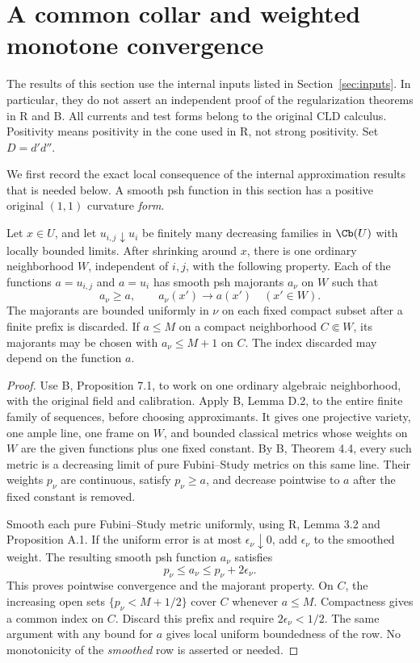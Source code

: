 \section{A common collar and weighted monotone convergence}
\label{sec:monotone}

The results of this section use the internal inputs listed in
Section~\ref{sec:inputs}. In particular, they do not assert an independent
proof of the regularization theorems in \textup{R} and \textup{B}.
All currents and test forms belong to the original CLD calculus.
Positivity means positivity in the cone used in \textup{R}, not strong
positivity. Set $D=d'd''$.

We first record the exact local consequence of the internal approximation
results that is needed below. A smooth psh function in this section has a
positive original $(1,1)$ curvature \emph{form}.

\begin{lemma}
\label{lem:common-majorants}
Let $x\in U$, and let $u_{i,j}\downarrow u_i$ be finitely many decreasing
families in $\Cb(U)$ with locally bounded limits. After shrinking around
$x$, there is one ordinary neighborhood $W$, independent of $i,j$, with
the following property. Each of the functions $a=u_{i,j}$ and $a=u_i$
has smooth psh majorants $a_\nu$ on $W$ such that
\[
 a_\nu\geq a,\qquad a_\nu(x')\longrightarrow a(x')\quad(x'\in W).
\]
The majorants are bounded uniformly in $\nu$ on each fixed compact subset
after a finite prefix is discarded. If $a\leq M$ on a compact neighborhood
$C\Subset W$, its majorants may be chosen with $a_\nu\leq M+1$ on $C$.
The index discarded may depend on the function $a$.
\end{lemma}

\begin{proof}
Use \textup{B}, Proposition 7.1, to work on one ordinary algebraic
neighborhood, with the original field and calibration. Apply \textup{B},
Lemma D.2, to the entire finite family of sequences, before choosing
approximants. It gives one projective variety, one ample line, one frame
on $W$, and bounded classical metrics whose weights on $W$ are the given
functions plus one fixed constant. By \textup{B}, Theorem 4.4, every such
metric is a decreasing limit of pure Fubini--Study metrics on this same
line. Their weights $p_\nu$ are continuous, satisfy $p_\nu\geq a$, and
decrease pointwise to $a$ after the fixed constant is removed.

Smooth each pure Fubini--Study metric uniformly, using \textup{R},
Lemma 3.2 and Proposition A.1. If the uniform error is at most
$\epsilon_\nu\downarrow0$, add $\epsilon_\nu$ to the smoothed weight.
The resulting smooth psh function $a_\nu$ satisfies
\[
 p_\nu\leq a_\nu\leq p_\nu+2\epsilon_\nu.
\]
This proves pointwise convergence and the majorant property.
On $C$, the increasing open sets $\{p_\nu<M+1/2\}$ cover $C$ whenever
$a\leq M$. Compactness gives a common index on $C$. Discard this prefix
and require $2\epsilon_\nu<1/2$. The same argument with any bound for
$a$ gives local uniform boundedness of the row. No monotonicity of the
\emph{smoothed} row is asserted or needed.
\end{proof}

